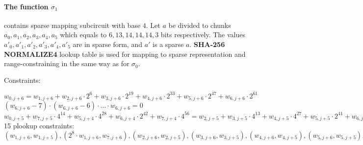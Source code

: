 \paragraph{The function $\sigma_1$} contains sparse mapping subcircuit with base $4$.
Let $a$ be divided to chunks $a_0, a_1, a_2, a_3, a_4, a_5$ which equals to $6, 13, 14, 14, 14, 3$ bits respectively.
The values $a'_0, a'_1, a'_2, a'_3, a'_4, a'_5$ are in sparse form, and $a'$ is a sparse $a$.
\textbf{SHA-256 NORMALIZE4} lookup table is used for mapping to sparse representation and range-constraining in the same way as for $\sigma_0$.

Constraints:
\begin{center}
    $w_{0, j + 6} = w_{1, j + 6} + w_{2, j + 6} \cdot 2^{6} + w_{3, j + 6} \cdot 2^{19} + w_{4, j + 6} \cdot 2^{33} + w_{5, j + 6} \cdot 2^{47} + w_{6,  j + 6}\cdot 2^{61}$ \\
    $(w_{6, j + 6} - 7) \cdot (w_{6, j + 6} - 6) \cdot ... \cdot w_{6, j + 6} = 0$ \\
    $w_{0, j + 5} + w_{7, j + 5} \cdot 4^{14} + w_{5, j + 4} \cdot 4^{28} + w_{6, j + 4} \cdot 2^{42} + w_{7, j + 4} \cdot 4^{56} = w_{2, j + 5} + w_{3, j + 5} \cdot 4^{13} + w_{4, j + 5} \cdot 4^{27} + w_{5, j + 5} \cdot 2^{41} + w_{6, j + 5} \cdot 4^{55} +
     w_{3, j + 5} + w_{4, j + 5} \cdot 4^{14} + w_{5, j + 5} \cdot 4^{28} + w_{6, j + 5} \cdot 2^{42} + w_{1, j + 5} \cdot 4^{45} + w_{2, j + 5} \cdot 4^{51} + 
     w_{6, j + 5} + w_{1, j + 5} \cdot 4^{3} + w_{2, j + 5} \cdot 4^{9} + w_{3, j + 5} \cdot 2^{22} + w_{4, j + 5} \cdot 4^{36} + w_{5, j + 5} \cdot 4^{50}$ \\
    15 plookup constraints: $(w_{1, j + 6}, w_{1, j + 5}), ( 2^{8} \cdot w_{1, j + 6}, w_{7, j + 6}), (w_{2, j + 6}, w_{2, j + 5}), (w_{3, j + 6}, w_{3, j + 5}), (w_{4, j + 6}, w_{4, j + 5}), (w_{5, j + 6}, w_{5, j + 5}),  (w_{6, j + 6}, w_{6, j + 5}),  (2 \cdot w_{6, j + 6}, w_{8, j + 6}), (w_{0, j + 4}, w_{0, j + 5}), (w_{1, j + 4}, w_{7, j + 5}), (w_{2, j + 4}, w_{5, j + 4}), (w_{3, j + 4}, w_{6, j + 4}), (w_{4, j + 4}, w_{7, j + 4}), (2^6 \cdot w_{4, j + 4}, w_{8, j + 4})$
\end{center}

